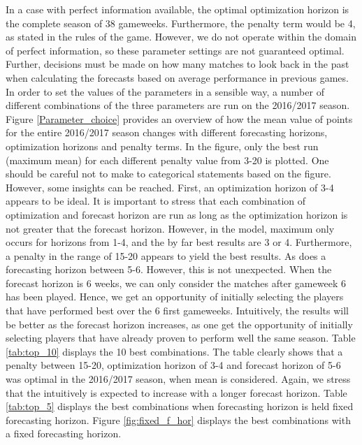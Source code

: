 In a case with perfect information available, the optimal optimization horizon is the complete season of 38 gameweeks. Furthermore, the penalty term would be 4, as stated in the rules of the game. However, we do not operate within the domain of perfect information, so these parameter settings are not guaranteed optimal. Further, decisions must be made on how many matches to look back in the past when calculating the forecasts based on average performance in previous games.
\newpar 
In order to set the values of the parameters in a sensible way, a number of different combinations of the three parameters are run on the 2016/2017 season. Figure \ref{Parameter_choice} provides an overview of how the mean value of points for the entire 2016/2017 season changes with different forecasting horizons, optimization horizons and penalty terms. In the figure, only the best run (maximum mean) for each different penalty value from 3-20 is plotted. One should be careful not to make to categorical statements based on the figure. However, some insights can be reached. First, an optimization horizon of 3-4 appears to  be ideal. It is important to stress that each combination of optimization and forecast horizon are run as long as the optimization horizon is not greater that the forecast horizon. However, in the model, maximum only occurs for horizons from 1-4, and the by far best results are 3 or 4. Furthermore, a penalty in the range of 15-20 appears to yield the best results. As does a forecasting horizon between 5-6. However, this is not unexpected. When the forecast horizon is 6 weeks, we can only consider the matches after gameweek 6 has been played. Hence, we get an opportunity of initially selecting the players that have performed best over the 6 first gameweeks. Intuitively, the results will be better as the forecast horizon increases, as one get the opportunity of initially selecting players that have already proven to perform well the same season. Table \ref{tab:top_10} displays the 10 best combinations. The table clearly shows that a penalty between 15-20, optimization horizon of 3-4 and forecast horizon of 5-6 was optimal in the 2016/2017 season, when mean is considered. Again, we stress that the intuitively is expected to increase with a longer forecast horizon. Table \ref{tab:top_5} displays the best combinations when forecasting horizon is held fixed forecasting horizon. Figure \ref{fig:fixed_f_hor} displays the best combinations with a fixed forecasting horizon.

